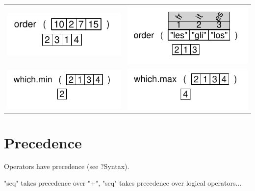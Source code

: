 \documentclass[pdflatex]{article}
\begin{document}
\begin{tabular}{cc}
\includegraphics{order} & \includegraphics{order2}\\
\includegraphics{which_min} & \includegraphics{which_max}\\
\end{tabular}


\section{Precedence}

Operators have precedence (see ?Syntax).

"seq" takes precedence over "+", "seq" takes precedence over logical operators...
\end{document}
